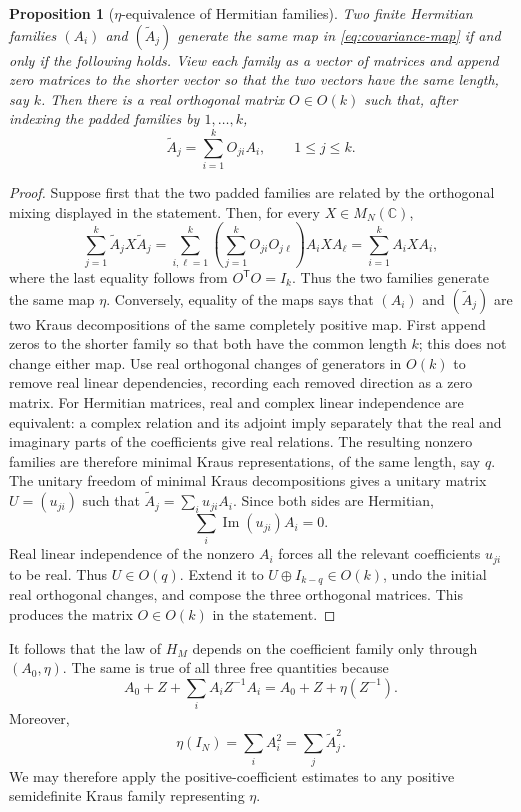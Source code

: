 \documentclass{article}
\newtheorem{proposition}[theorem]{Proposition}
\newcommand{\C}{\mathbb C}
\DeclareMathOperator{\Ima}{Im}
\begin{document}
\begin{proposition}[$\eta$-equivalence of Hermitian families]
	\label{prop:eta-equivalence}
	Two finite Hermitian families $(A_i)$ and $(\widetilde A_j)$ generate the
	same map in \eqref{eq:covariance-map} if and only if the following holds.
	View each family as a vector of matrices and append zero matrices to the
	shorter vector so that the two vectors have the same length, say $k$.
	Then there is a real orthogonal matrix $O\in O(k)$ such that, after indexing
	the padded families by $1,\ldots,k$,
	\[
		\widetilde A_j=\sum_{i=1}^k O_{ji}A_i,
		\qquad 1\leq j\leq k.
	\]
\end{proposition}

\begin{proof}
	Suppose first that the two padded families are related by the orthogonal
	mixing displayed in the statement.  Then, for every $X\in M_N(\C)$,
	\[
		\sum_{j=1}^k\widetilde A_jX\widetilde A_j
		=\sum_{i,\ell=1}^k
		\left(\sum_{j=1}^kO_{ji}O_{j\ell}\right)A_iXA_\ell
		=\sum_{i=1}^kA_iXA_i,
	\]
	where the last equality follows from $O^{\mathsf T}O=I_k$.  Thus the two
	families generate the same map $\eta$.  Conversely, equality of the maps
	says that $(A_i)$ and $(\widetilde A_j)$ are two Kraus decompositions of the
	same completely positive map.  First append zeros to the shorter family so
	that both have the common length \(k\); this does not change either map.
	Use real orthogonal changes of generators in \(O(k)\) to remove real linear
	dependencies, recording each removed direction as a zero matrix.  For
	Hermitian matrices, real and complex linear independence are equivalent:
	a complex relation and its adjoint imply separately that the real and
	imaginary parts of the coefficients give real relations.  The resulting
	nonzero families are therefore minimal Kraus representations, of the same
	length, say \(q\).
	The unitary freedom of minimal Kraus decompositions
	\cite[Corollary~2.23]{Watrous2018} gives a unitary matrix $U=(u_{ji})$ such
	that
	$\widetilde A_j=\sum_i u_{ji}A_i$.  Since both sides are Hermitian,
	\[
		\sum_i\Ima(u_{ji})A_i=0.
	\]
	Real linear independence of the nonzero $A_i$ forces all the relevant
	coefficients $u_{ji}$ to be real.  Thus $U\in O(q)$.  Extend it to
	\(U\oplus I_{k-q}\in O(k)\), undo the initial real orthogonal changes, and
	compose the three orthogonal matrices.  This produces the matrix
	\(O\in O(k)\) in the statement.
\end{proof}

It follows that the law of $H_M$ depends on the coefficient family only through
$(A_0,\eta)$.  The same is true of all three free quantities because
\[
	A_0+Z+\sum_iA_iZ^{-1}A_i=A_0+Z+\eta(Z^{-1}).
\]
Moreover,
\begin{equation}
	\label{eq:eta-identity}
	\eta(I_N)=\sum_iA_i^2=\sum_j\widetilde A_j^2.
\end{equation}
We may therefore apply the positive-coefficient estimates to any positive
semidefinite Kraus family representing $\eta$.
\end{document}
